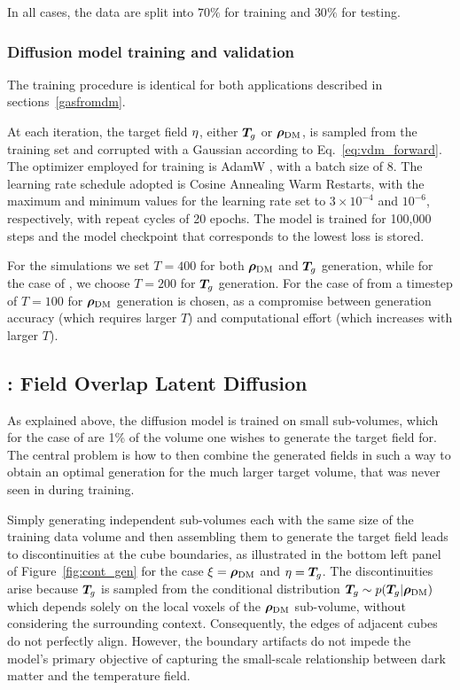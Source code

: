 In all cases, the data are split into $70\%$ for training and $30\%$ for testing.

\subsubsection{Diffusion model training and validation}
The training procedure is identical for both applications described in sections~\ref{gasfromdm}.

At each iteration, the target field $\eta$, either $\bm{T}_g$ or $\boldsymbol{\rho}_\mathrm{DM}$, is sampled from the training set and corrupted with a Gaussian according to Eq.~\eqref{eq:vdm_forward}.
The optimizer employed for training is AdamW \citep{adamw}, with a batch size of 8. The learning rate schedule adopted is Cosine Annealing Warm Restarts, with the maximum and minimum values for the learning rate set to $3\times10^{-4}$ and $10^{-6}$, respectively, with repeat cycles of 20 epochs. The model is trained for 100{,}000 steps and the model checkpoint that corresponds to the lowest loss is stored.


For the \CAMELS simulations we set $T=400$ for both $\boldsymbol{\rho}_\mathrm{DM}$ and $\bm{T}_g$ generation, while for the case of \TNG, we choose $T=200$ for $\bm{T}_g$ generation. For the case of \TNG from \CAMELS a timestep of $T=100$ for $\boldsymbol{\rho}_\mathrm{DM}$ generation is chosen, as a compromise between generation accuracy (which requires larger $T$) and computational effort (which increases with larger $T$).


\subsection{\FOLD: Field Overlap Latent Diffusion}
\label{subsect:contgen}


As explained above, the diffusion model is trained on small sub-volumes, which for the case of \TNG are 1\% of the volume one wishes to generate the target field for. The central problem is how to then combine the generated fields in such a way to obtain an optimal generation for the much larger target volume, that was never seen in during training.

Simply generating independent sub-volumes each with the same size of the training data volume and then assembling them to generate the target field leads to discontinuities at the cube boundaries, as illustrated in the bottom left panel of Figure~\ref{fig:cont_gen} for the case $\xi=\boldsymbol{\rho}_\mathrm{DM}$ and $\eta=\bm{T}_g$. The discontinuities arise because $\bm{T}_g$ is sampled from the conditional distribution  $\bm{T}_g\sim p(\bm{T}_g|\boldsymbol{\rho}_\mathrm{DM})$ which depends solely on the local voxels of the $\boldsymbol{\rho}_\mathrm{DM}$ sub-volume, without considering the surrounding context. Consequently, the edges of adjacent cubes do not perfectly align. However, the boundary artifacts do not impede the model’s primary objective of capturing the small-scale relationship between dark matter and the temperature field.

